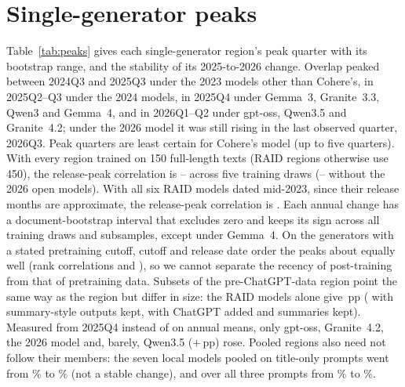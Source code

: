 \documentclass[11pt]{article}
\newcommand{\pp}{\,pp}
\begin{document}
\section{Single-generator peaks}
\label{app:peaks}
Table~\ref{tab:peaks} gives each single-generator region's peak quarter with its bootstrap range, and the stability
of its 2025-to-2026 change. Overlap peaked between 2024Q3 and 2025Q3 under the 2023 models other than Cohere's, in 2025Q2--Q3 under the 2024 models, in 2025Q4 under Gemma~3, Granite~3.3, Qwen3 and Gemma~4, and in 2026Q1--Q2 under gpt-oss, Qwen3.5 and Granite~4.2; under the 2026 model it was still rising in the last observed quarter, 2026Q3. Peak quarters are least certain for Cohere's model (up to five quarters). With every region trained on 150 full-length texts (RAID regions otherwise use 450), the release-peak correlation is -- across five training draws (-- without the 2026 open models). With all six RAID models dated mid-2023, since their release months are approximate, the release-peak correlation is . Each annual change has a document-bootstrap interval that excludes zero and keeps its sign across all training draws and subsamples, except under Gemma~4. On the  generators with a stated pretraining cutoff, cutoff and release date order the peaks about equally well (rank correlations  and ), so we cannot separate the recency of post-training from that of pretraining data. Subsets of the pre-ChatGPT-data region point the same way as the region but differ in size: the RAID models alone give \pp{} ( with summary-style outputs kept,  with ChatGPT added and summaries kept). Measured from 2025Q4 instead of on annual means, only gpt-oss, Granite~4.2, the 2026 model and, barely, Qwen3.5
($+$\pp) rose. Pooled regions also need not follow their members: the seven local models pooled on title-only prompts went from \% to \% (not a stable change), and over all three prompts from \% to \%.
\end{document}
